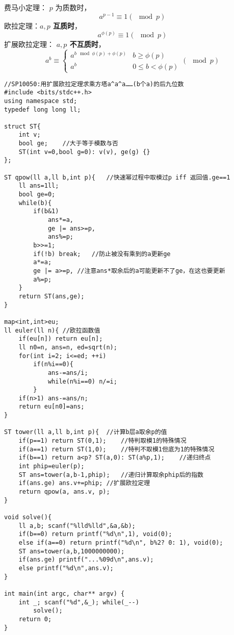 费马小定理： $p$ 为质数时，$$a^{p-1} \equiv 1 (\mod p) $$
欧拉定理：\textbf{$a,p$ 互质时}， $$a^{\phi(p)} \equiv 1 (\mod p) $$ 
扩展欧拉定理： \textbf{$a,p$ 不互质时}， $$a^b\equiv
\begin{cases}
a^{b \mod \phi(p) + \phi(p)} & {b \ge \phi(p)}\\
a^b & {0 \le b < \phi(p)}
\end{cases}
(\mod p)$$
\begin{lstlisting}
//SP10050:用扩展欧拉定理求乘方塔a^a^a……(b个a)的后九位数
#include <bits/stdc++.h>
using namespace std;
typedef long long ll;

struct ST{
	int v;
	bool ge;	//大于等于模数与否
	ST(int v=0,bool g=0): v(v), ge(g) {} 
};

ST qpow(ll a,ll b,int p){	//快速幂过程中取模过p iff 返回值.ge==1
	ll ans=1ll;
	bool ge=0;
	while(b){
		if(b&1)
			ans*=a,
			ge |= ans>=p,
			ans%=p;
		b>>=1;
		if(!b) break;	//防止被没有乘到的a更新ge
		a*=a;
		ge |= a>=p,	//注意ans*取余后的a可能更新不了ge，在这也要更新 
		a%=p;
	}
	return ST(ans,ge);
}

map<int,int>eu;
ll euler(ll n){	//欧拉函数值
	if(eu[n]) return eu[n];
	ll n0=n, ans=n, ed=sqrt(n);
	for(int i=2; i<=ed; ++i)
		if(n%i==0){
			ans-=ans/i;
			while(n%i==0) n/=i;
		}
	if(n>1) ans-=ans/n;
	return eu[n0]=ans;
}

ST tower(ll a,ll b,int p){	//计算b层a取余p的值 
	if(p==1) return ST(0,1);	//特判取模1的特殊情况 
	if(a==1) return ST(1,0);	//特判不取模1但底为1的特殊情况
	if(b==1) return a<p? ST(a,0): ST(a%p,1);	//递归终点
	int phip=euler(p);
	ST ans=tower(a,b-1,phip);	//递归计算取余phip后的指数
	if(ans.ge) ans.v+=phip;	//扩展欧拉定理 
	return qpow(a, ans.v, p);
}

void solve(){
	ll a,b; scanf("%lld%lld",&a,&b);
	if(b==0) return printf("%d\n",1), void(0);
	else if(a==0) return printf("%d\n", b%2? 0: 1), void(0);
	ST ans=tower(a,b,1000000000);
	if(ans.ge) printf("...%09d\n",ans.v);
	else printf("%d\n",ans.v);
}

int main(int argc, char** argv) {
	int _; scanf("%d",&_); while(_--)
		solve();
	return 0;
}

\end{lstlisting}